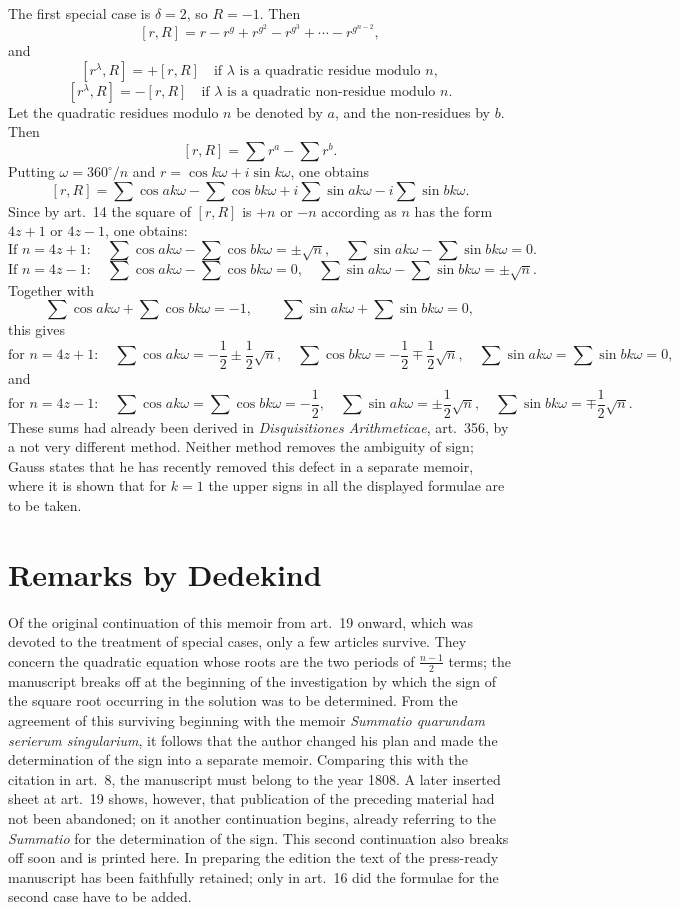 \documentclass[12pt]{article}
\begin{document}
The first special case is $\delta=2$, so $R=-1$. Then
\[
[r,R]=r-r^g+r^{g^2}-r^{g^3}+\cdots-r^{g^{n-2}},
\]
and
\[
[r^\lambda,R]=+[r,R]\quad\text{if }\lambda\text{ is a quadratic residue modulo }n,
\]
\[
[r^\lambda,R]=-[r,R]\quad\text{if }\lambda\text{ is a quadratic non-residue modulo }n.
\]
Let the quadratic residues modulo $n$ be denoted by $a$, and the non-residues by $b$. Then
\[
[r,R]=\sum r^a-\sum r^b.
\]
Putting $\omega=360^\circ/n$ and $r=\cos k\omega+i\sin k\omega$, one obtains
\[
[r,R]=\sum\cos ak\omega-\sum\cos bk\omega
+i\sum\sin ak\omega-i\sum\sin bk\omega.
\]
Since by art.~14 the square of $[r,R]$ is $+n$ or $-n$ according as $n$ has the form $4z+1$ or $4z-1$, one obtains:
\[
\text{If }n=4z+1:\quad
\sum\cos ak\omega-\sum\cos bk\omega=\pm\sqrt n,\quad
\sum\sin ak\omega-\sum\sin bk\omega=0.
\]
\[
\text{If }n=4z-1:\quad
\sum\cos ak\omega-\sum\cos bk\omega=0,\quad
\sum\sin ak\omega-\sum\sin bk\omega=\pm\sqrt n.
\]
Together with
\[
\sum\cos ak\omega+\sum\cos bk\omega=-1,\qquad
\sum\sin ak\omega+\sum\sin bk\omega=0,
\]
this gives
\[
\text{for }n=4z+1:\quad
\sum\cos ak\omega=-\frac12\pm\frac12\sqrt n,\quad
\sum\cos bk\omega=-\frac12\mp\frac12\sqrt n,\quad
\sum\sin ak\omega=\sum\sin bk\omega=0,
\]
and
\[
\text{for }n=4z-1:\quad
\sum\cos ak\omega=\sum\cos bk\omega=-\frac12,\quad
\sum\sin ak\omega=\pm\frac12\sqrt n,\quad
\sum\sin bk\omega=\mp\frac12\sqrt n.
\]
These sums had already been derived in \emph{Disquisitiones Arithmeticae}, art.~356, by a not very different method. Neither method removes the ambiguity of sign; Gauss states that he has recently removed this defect in a separate memoir, where it is shown that for $k=1$ the upper signs in all the displayed formulae are to be taken.

\section*{Remarks by Dedekind}

Of the original continuation of this memoir from art.~19 onward, which was devoted to the treatment of special cases, only a few articles survive. They concern the quadratic equation whose roots are the two periods of $\frac{n-1}{2}$ terms; the manuscript breaks off at the beginning of the investigation by which the sign of the square root occurring in the solution was to be determined. From the agreement of this surviving beginning with the memoir \emph{Summatio quarundam serierum singularium}, it follows that the author changed his plan and made the determination of the sign into a separate memoir. Comparing this with the citation in art.~8, the manuscript must belong to the year 1808. A later inserted sheet at art.~19 shows, however, that publication of the preceding material had not been abandoned; on it another continuation begins, already referring to the \emph{Summatio} for the determination of the sign. This second continuation also breaks off soon and is printed here. In preparing the edition the text of the press-ready manuscript has been faithfully retained; only in art.~16 did the formulae for the second case have to be added.
\end{document}

